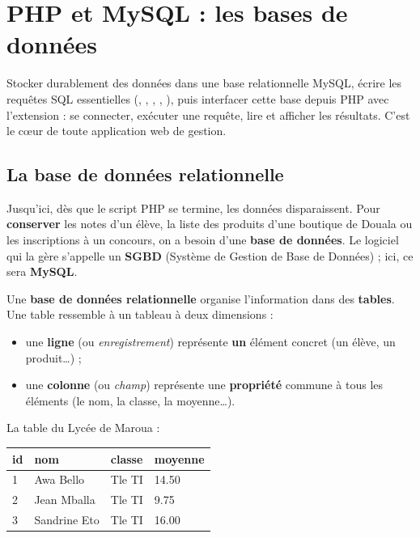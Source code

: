 \chapter{PHP et MySQL : les bases de données}

\begin{synthese}[Au programme]
Stocker durablement des données dans une base relationnelle MySQL, écrire les
requêtes SQL essentielles (, , ,
, ), puis interfacer cette base depuis PHP avec
l'extension  : se connecter, exécuter une requête, lire et afficher
les résultats. C'est le cœur de toute application web de gestion.
\end{synthese}

\section{La base de données relationnelle}

Jusqu'ici, dès que le script PHP se termine, les données disparaissent. Pour
\textbf{conserver} les notes d'un élève, la liste des produits d'une boutique de
Douala ou les inscriptions à un concours, on a besoin d'une \textbf{base de
données}. Le logiciel qui la gère s'appelle un \textbf{SGBD} (Système de Gestion
de Base de Données) ; ici, ce sera \textbf{MySQL}.

\begin{definition}
Une \textbf{base de données relationnelle} organise l'information dans des
\textbf{tables}. Une table ressemble à un tableau à deux dimensions :
\begin{itemize}
  \item une \textbf{ligne} (ou \emph{enregistrement}) représente \textbf{un}
  élément concret (un élève, un produit\dots) ;
  \item une \textbf{colonne} (ou \emph{champ}) représente une \textbf{propriété}
  commune à tous les éléments (le nom, la classe, la moyenne\dots).
\end{itemize}
\end{definition}

\begin{exemple}
La table  du Lycée de Maroua :

\begin{center}\small
\begin{tabular}{@{}llll@{}}
\toprule
\textbf{id} & \textbf{nom} & \textbf{classe} & \textbf{moyenne}\\
\midrule
1 & Awa Bello   & Tle TI & 14.50\\
2 & Jean Mballa & Tle TI & 9.75\\
3 & Sandrine Eto & Tle TI & 16.00\\
\bottomrule
\end{tabular}
\end{center}
\end{exemple}

